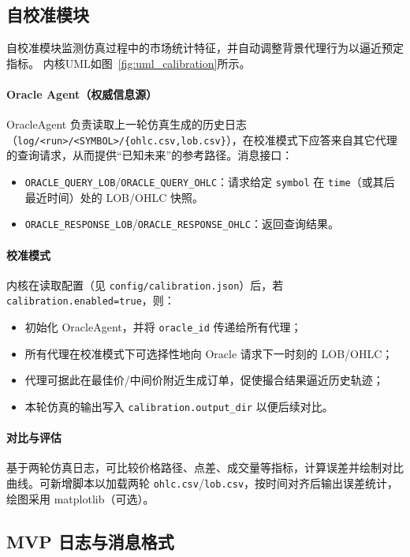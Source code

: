 \subsection{自校准模块}

自校准模块监测仿真过程中的市场统计特征，并自动调整背景代理行为以逼近预定指标。
内核UML如图~\ref{fig:uml_calibration}所示。

\paragraph{Oracle Agent（权威信息源）}
OracleAgent 负责读取上一轮仿真生成的历史日志（\verb|log/<run>/<SYMBOL>/{ohlc.csv,lob.csv}|），在校准模式下应答来自其它代理的查询请求，从而提供“已知未来”的参考路径。消息接口：
\begin{itemize}
  \item \verb|ORACLE_QUERY_LOB|/\verb|ORACLE_QUERY_OHLC|：请求给定 \verb|symbol| 在 \verb|time|（或其后最近时间）处的 LOB/OHLC 快照。
  \item \verb|ORACLE_RESPONSE_LOB|/\verb|ORACLE_RESPONSE_OHLC|：返回查询结果。
\end{itemize}

\paragraph{校准模式}
内核在读取配置（见 \verb|config/calibration.json|）后，若 \verb|calibration.enabled=true|，则：
\begin{itemize}
  \item 初始化 OracleAgent，并将 \verb|oracle_id| 传递给所有代理；
  \item 所有代理在校准模式下可选择性地向 Oracle 请求下一时刻的 LOB/OHLC；
  \item 代理可据此在最佳价/中间价附近生成订单，促使撮合结果逼近历史轨迹；
  \item 本轮仿真的输出写入 \verb|calibration.output_dir| 以便后续对比。
\end{itemize}

\paragraph{对比与评估}
基于两轮仿真日志，可比较价格路径、点差、成交量等指标，计算误差并绘制对比曲线。可新增脚本以加载两轮 \verb|ohlc.csv|/\verb|lob.csv|，按时间对齐后输出误差统计，绘图采用 matplotlib（可选）。

\subsection{MVP 日志与消息格式}

